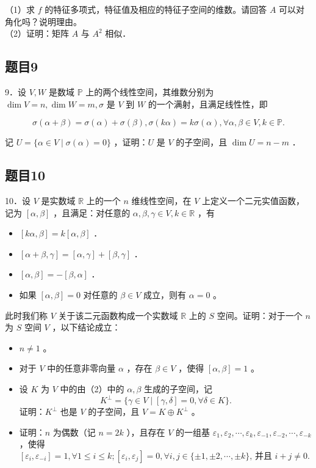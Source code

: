 \documentclass{article}
\begin{document}
（1）求 \(f\) 的特征多项式，特征值及相应的特征子空间的维数。请回答 \(A\) 可以对角化吗？说明理由。\\
（2）证明：矩阵 \(A\) 与 \(A^{2}\) 相似．

\subsection{题目9}
9．设 \(V, W\) 是数域 \(\mathbb{P}\) 上的两个线性空间，其维数分别为 \(\operatorname{dim} V=n, \operatorname{dim} W=m, \sigma\) 是 \(V\) 到 \(W\) 的一个满射，且满足线性性，即

\[
\sigma(\alpha+\beta)=\sigma(\alpha)+\sigma(\beta), \sigma(k \alpha)=k \sigma(\alpha), \forall \alpha, \beta \in V, k \in \mathbb{P} .
\]

记 \(U=\{\alpha \in V \mid \sigma(\alpha)=0\}\) ，证明：\(U\) 是 \(V\) 的子空间，且 \(\operatorname{dim} U=n-m\) ．

\subsection{题目10}
10．设 \(V\) 是实数域 \(\mathbb{R}\) 上的一个 \(n\) 维线性空间，在 \(V\) 上定义一个二元实值函数，记为 \([\alpha, \beta]\) ，且满足：对任意的 \(\alpha, \beta, \gamma \in V, k \in \mathbb{R}\) ，有

\begin{itemize}
  \item[（i）] \([k \alpha, \beta]=k[\alpha, \beta]\) ．
  \item[（ii）] \([\alpha+\beta, \gamma]=[\alpha, \gamma]+[\beta, \gamma]\) ．
  \item[（iii）] \([\alpha, \beta]=-[\beta, \alpha]\) ．
  \item[（iv）] 如果 \([\alpha, \beta]=0\) 对任意的 \(\beta \in V\) 成立，则有 \(\alpha=0\) 。
\end{itemize}

此时我们称 \(V\) 关于该二元函数构成一个实数域 \(\mathbb{R}\) 上的 \(S\) 空间。证明：对于一个 \(n\) 为 \(S\) 空间 \(V\) ，以下结论成立：

\begin{itemize}
  \item[（1）] \(n \neq 1\) 。
  \item[（2）] 对于 \(V\) 中的任意非零向量 \(\alpha\) ，存在 \(\beta \in V\) ，使得 \([\alpha, \beta]=1\) 。
  \item[（3）] 设 \(K\) 为 \(V\) 中的由（2）中的 \(\alpha, \beta\) 生成的子空间，记
\[
K^{\perp}=\{\gamma \in V \mid[\gamma, \delta]=0, \forall \delta \in K\} .
\]
证明：\(K^{\perp}\) 也是 \(V\) 的子空间，且 \(V=K \oplus K^{\perp}\) 。
  \item[（4）] 证明：\(n\) 为偶数（记 \(n=2 k\) ），且存在 \(V\) 的一组基 \(\varepsilon_{1}, \varepsilon_{2}, \cdots, \varepsilon_{k}, \varepsilon_{-1}, \varepsilon_{-2}, \cdots, \varepsilon_{-k}\) ，使得
\[
\left[\varepsilon_{i}, \varepsilon_{-i}\right]=1, \forall 1 \leq i \leq k ;\left[\varepsilon_{i}, \varepsilon_{j}\right]=0, \forall i, j \in\{ \pm 1, \pm 2, \cdots, \pm k\} \text {, 并且 } i+j \neq 0 \text {. }
\]
\end{itemize}
\end{document}
